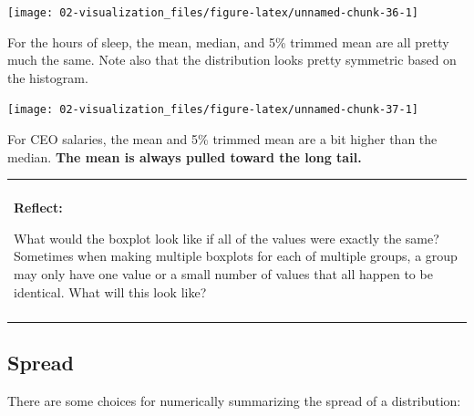 \documentclass[
]{book}
\newenvironment{reflect}
{
    \begin{center}
    
    \begin{tabular}{|p{0.8\textwidth}|}
    \rowcolor{LightBlue}
    \hline\\
    \rowcolor{LightBlue}
    \textbf{Reflect:}
}
{
    \\\rowcolor{LightBlue}
    \\\hline
    \end{tabular} 
    \end{center}
}
\begin{document}
\begin{center}\texttt{[image: 02-visualization\_files/figure-latex/unnamed-chunk-36-1]} \end{center}

For the hours of sleep, the mean, median, and 5\% trimmed mean are all pretty much the same. Note also that the distribution looks pretty symmetric based on the histogram.

\begin{center}\texttt{[image: 02-visualization\_files/figure-latex/unnamed-chunk-37-1]} \end{center}

For CEO salaries, the mean and 5\% trimmed mean are a bit higher than the median. \textbf{The mean is always pulled toward the long tail.}

\begin{reflect}
What would the boxplot look like if all of the values were exactly the
same? Sometimes when making multiple boxplots for each of multiple
groups, a group may only have one value or a small number of values that
all happen to be identical. What will this look like?
\end{reflect}

\subsection{Spread}\label{spread}

There are some choices for numerically summarizing the spread of a distribution:
\end{document}
